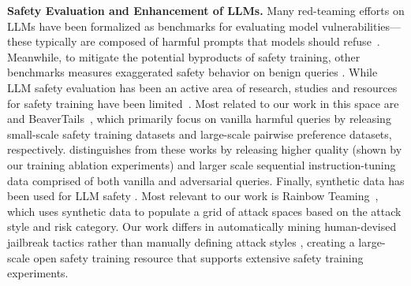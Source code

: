 \textbf{Safety Evaluation and Enhancement of LLMs.}
Many red-teaming efforts on LLMs have been formalized as benchmarks for evaluating model vulnerabilities---these typically are composed of harmful prompts that models should refuse~\citep{adversariallyaligned,wei2023jailbroken,wang2023donotanswer,sun2024trustllm,mazeika2024harmbench,geiping2024coercing,wang2024decodingtrust,chao2024jailbreakbench}. Meanwhile, to mitigate the potential byproducts of safety training, other benchmarks measures exaggerated safety behavior on benign queries \citep{xstest,cui2024orbench}. While LLM safety evaluation has been an active area of research, studies and resources for safety training have been limited~\citep{hh-rlhf,dai2023safe,yang2023alignment}. Most related to our work in this space are \safellama \citep{bianchi2023safety} and BeaverTails~\citep{beavertails}, which primarily focus on vanilla harmful queries by releasing small-scale safety training datasets and large-scale pairwise preference datasets, respectively. \method distinguishes from these works by releasing higher quality (shown by our training ablation experiments) and larger scale sequential instruction-tuning data comprised of both vanilla and adversarial queries. Finally, synthetic data has been used for LLM safety \cite{casper2023explore,perez2022discovering,hubinger2024sleeper}. Most relevant to our work is Rainbow Teaming~\cite{rainbowteaming}, which uses synthetic data to populate a grid of attack spaces based on the attack style and risk category. Our work differs in automatically mining human-devised jailbreak tactics rather than manually defining attack styles \cite{rainbowteaming}, creating a large-scale open safety training resource that supports extensive safety training experiments.
